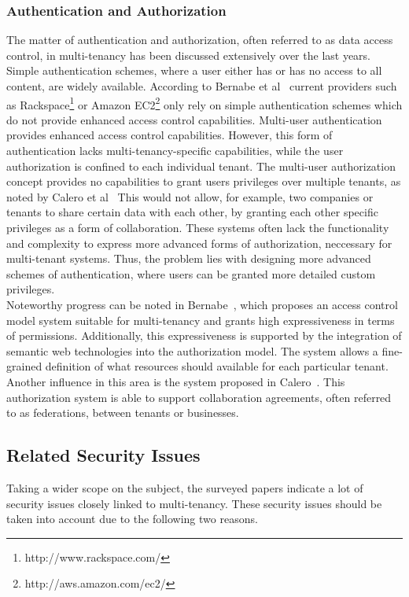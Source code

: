 \subsubsection{Authentication and Authorization}
The matter of authentication and authorization, often referred to as data access control, in multi-tenancy has been discussed extensively over the last years. 
Simple authentication schemes, where a user either has or has no access to all content, are widely available.
According to Bernabe et al~\cite{Bernabe2012Auth} current providers such as Rackspace\footnote{http://www.rackspace.com/} or Amazon EC2\footnote{http://aws.amazon.com/ec2/} only rely on simple authentication schemes which do not provide enhanced access control capabilities. 
Multi-user authentication provides enhanced access control capabilities.
However, this form of authentication lacks multi-tenancy-specific capabilities, while the user authorization is confined to each individual tenant. %
The multi-user authorization concept provides no capabilities to grant users privileges over multiple tenants, as noted by Calero et al~\cite{Calero2010Auth}
This would not allow, for example, two companies or tenants to share certain data with each other, by granting each other specific privileges as a form of collaboration.
These systems often lack the functionality and complexity to express more advanced forms of authorization, neccessary for multi-tenant systems.
Thus, the problem lies with designing more advanced schemes of authentication, where users can be granted more detailed custom privileges.\\

Noteworthy progress can be noted in Bernabe~\cite{Bernabe2012Auth}, which proposes an access control model system suitable for multi-tenancy and grants high expressiveness in terms of permissions. 
Additionally, this expressiveness is supported by the integration of semantic web technologies into the authorization model. 
The system allows a fine-grained definition of what resources should available for each particular tenant. 
Another influence in this area is the system proposed in Calero~\cite{Calero2010Auth}. 
This authorization system is able to support collaboration agreements, often referred to as federations, between tenants or businesses.

\subsection{Related Security Issues}
Taking a wider scope on the subject, the surveyed papers indicate a lot of security issues closely linked to multi-tenancy. 
These security issues should be taken into account due to the following two reasons.

